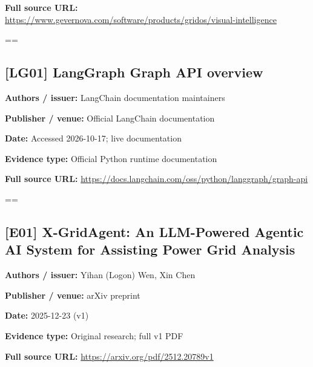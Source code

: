 \documentclass[10pt,letterpaper]{article}
\begin{document}
\textbf{Full source URL:} \href{https://www.gevernova.com/software/products/gridos/visual-intelligence}{\small\ttfamily https:/\allowbreak{}/\allowbreak{}www.\allowbreak{}gevernova.\allowbreak{}com/\allowbreak{}software/\allowbreak{}products/\allowbreak{}gridos/\allowbreak{}visual-\allowbreak{}intelligence}\par
\egroup\par\noindent\box\readingEntry\par\medskip
\setbox\readingEntry=\vbox\bgroup\hsize=\linewidth\subsection*{[LG01] LangGraph Graph API overview}
\textbf{Authors / issuer:} LangChain documentation maintainers\par
\textbf{Publisher / venue:} Official LangChain documentation\par
\textbf{Date:} Accessed 2026-10-17; live documentation\par
\textbf{Evidence type:} Official Python runtime documentation\par
\textbf{Full source URL:} \href{https://docs.langchain.com/oss/python/langgraph/graph-api}{\small\ttfamily https:/\allowbreak{}/\allowbreak{}docs.\allowbreak{}langchain.\allowbreak{}com/\allowbreak{}oss/\allowbreak{}python/\allowbreak{}langgraph/\allowbreak{}graph-\allowbreak{}api}\par
\egroup\par\noindent\box\readingEntry\par\medskip
\setbox\readingEntry=\vbox\bgroup\hsize=\linewidth\subsection*{[E01] X-GridAgent: An LLM-Powered Agentic AI System for Assisting Power Grid Analysis}
\textbf{Authors / issuer:} Yihan (Logon) Wen, Xin Chen\par
\textbf{Publisher / venue:} arXiv preprint\par
\textbf{Date:} 2025-12-23 (v1)\par
\textbf{Evidence type:} Original research; full v1 PDF\par
\textbf{Full source URL:} \href{https://arxiv.org/pdf/2512.20789v1}{\small\ttfamily https:/\allowbreak{}/\allowbreak{}arxiv.\allowbreak{}org/\allowbreak{}pdf/\allowbreak{}2512.\allowbreak{}20789v1}\par
\egroup\par\noindent\box\readingEntry\par\medskip
\end{document}
